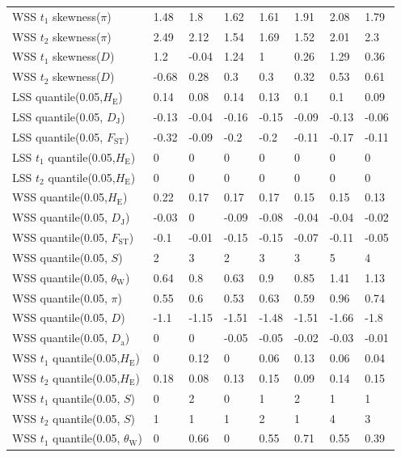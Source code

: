 \documentclass[a4paper, 12pt]{article}
\begin{document}
\begin{tiny}
\begin{longtable}{p{3.0cm}p{1.0cm}p{1.0cm}p{1.0cm}p{1.0cm}p{1.0cm}p{1.0cm}p{1.0cm}}
WSS $t_1$ skewness($\pi$) & 1.48 & 1.8 & 1.62 & 1.61 & 1.91 & 2.08 & 1.79 \\
WSS $t_2$ skewness($\pi$) & 2.49 & 2.12 & 1.54 & 1.69 & 1.52 & 2.01 & 2.3 \\
WSS $t_1$ skewness($D$) & 1.2 & -0.04 & 1.24 & 1 & 0.26 & 1.29 & 0.36 \\
WSS $t_2$ skewness($D$) & -0.68 & 0.28 & 0.3 & 0.3 & 0.32 & 0.53 & 0.61 \\
LSS quantile(0.05,$H_{\mathrm{E}}$) & 0.14 & 0.08 & 0.14 & 0.13 & 0.1 & 0.1 & 0.09 \\
LSS quantile(0.05, $D_{\mathrm{J}}$) & -0.13 & -0.04 & -0.16 & -0.15 & -0.09 & -0.13 & -0.06 \\
LSS quantile(0.05, $F_{\mathrm{ST}}$) & -0.32 & -0.09 & -0.2 & -0.2 & -0.11 & -0.17 & -0.11 \\
LSS $t_1$ quantile(0.05,$H_{\mathrm{E}}$) & 0 & 0 & 0 & 0 & 0 & 0 & 0 \\
LSS $t_2$ quantile(0.05,$H_{\mathrm{E}}$) & 0 & 0 & 0 & 0 & 0 & 0 & 0 \\
WSS quantile(0.05,$H_{\mathrm{E}}$) & 0.22 & 0.17 & 0.17 & 0.17 & 0.15 & 0.15 & 0.13 \\
WSS quantile(0.05, $D_{\mathrm{J}}$) & -0.03 & 0 & -0.09 & -0.08 & -0.04 & -0.04 & -0.02 \\
WSS quantile(0.05, $F_{\mathrm{ST}}$) & -0.1 & -0.01 & -0.15 & -0.15 & -0.07 & -0.11 & -0.05 \\
WSS quantile(0.05, $S$) & 2 & 3 & 2 & 3 & 3 & 5 & 4 \\
WSS quantile(0.05, $\theta_{\mathrm{W}}$) & 0.64 & 0.8 & 0.63 & 0.9 & 0.85 & 1.41 & 1.13 \\
WSS quantile(0.05, $\pi$) & 0.55 & 0.6 & 0.53 & 0.63 & 0.59 & 0.96 & 0.74 \\
WSS quantile(0.05, $D$) & -1.1 & -1.15 & -1.51 & -1.48 & -1.51 & -1.66 & -1.8 \\
WSS quantile(0.05, $D_{\mathrm{a}}$) & 0 & 0 & -0.05 & -0.05 & -0.02 & -0.03 & -0.01 \\
WSS $t_1$ quantile(0.05,$H_{\mathrm{E}}$) & 0 & 0.12 & 0 & 0.06 & 0.13 & 0.06 & 0.04 \\
WSS $t_2$ quantile(0.05,$H_{\mathrm{E}}$) & 0.18 & 0.08 & 0.13 & 0.15 & 0.09 & 0.14 & 0.15 \\
WSS $t_1$ quantile(0.05, $S$) & 0 & 2 & 0 & 1 & 2 & 1 & 1 \\
WSS $t_2$ quantile(0.05, $S$) & 1 & 1 & 1 & 2 & 1 & 4 & 3 \\
WSS $t_1$ quantile(0.05, $\theta_{\mathrm{W}}$) & 0 & 0.66 & 0 & 0.55 & 0.71 & 0.55 & 0.39 \\

\end{longtable}
\end{tiny}
\end{document}
